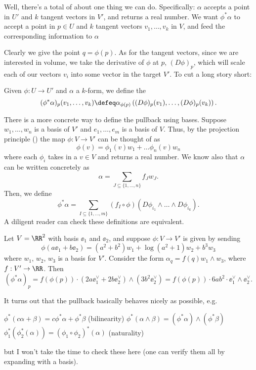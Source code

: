 \documentclass[11pt]{scrreprt}
\begin{document}
Well, there's a total of about one thing we can do.
Specifically: $\alpha$ accepts a point in $U'$ and $k$ tangent vectors in $V'$,
and returns a real number.
We want $\phi^\ast \alpha$ to accept a point in $p \in U$
and $k$ tangent vectors $v_1, \dots, v_k$ in $V$,
and feed the corresponding information to $\alpha$

Clearly we give the point $q = \phi(p)$.
As for the tangent vectors, since we are interested in volume, we take the
derivative of $\phi$ at $p$, $(D\phi)_p$, which will scale each of our vectors $v_i$
into some vector in the target $V'$.
To cut a long story short:
\begin{definition}
	Given $\phi : U \to U'$ and $\alpha$ a $k$-form, we define the 
	\[
		(\phi^\ast \alpha)_p(v_1, \dots, v_k)
		\defeq \alpha_{\phi(p)}
		\left( (D\phi)_p(v_1), \dots, (D\phi)_p(v_k) \right).
	\]
\end{definition}

There is a more concrete way to define the pullback using bases.
Suppose $w_1, \dots, w_n$ is a basis of $V'$
and $e_1, \dots, e_m$ is a basis of $V$.
Thus, by the projection principle () 
the map $\phi : V \to V'$ can be thought of as
\[ \phi(v) = \phi_1(v) w_1 +  \dots \phi_n(v) w_n \]
where each $\phi_i$ takes in a $v \in V$ and returns a real number.
We know also that $\alpha$ can be written concretely as
\[ \alpha = \sum_{J \subseteq \{1, \dots, n\}} f_J w_J. \]
Then, we define
\[
	\phi^\ast\alpha
	= \sum_{I \subseteq \{1, \dots, m\}}
	(f_I \circ \phi) (D\phi_{i_1} \wedge \dots \wedge D\phi_{i_k}).
\]
A diligent reader can check these definitions are equivalent.
\begin{example}
	Let $V = \RR^2$ with basis $\ee_1$ and $\ee_2$,
	and suppose $\phi : V \to V'$ is given by sending
	\[ \phi(a\ee_1 + b\ee_2) = (a^2+b^2)w_1 + \log(a^2+1) w_2 + b^3 w_3 \]
	where $w_1$, $w_2$, $w_3$ is a basis for $V'$.
	Consider the form $\alpha_q = f(q) w_1 \wedge w_3$, where $f : V' \to \RR$.
	Then
	\[ (\phi^\ast\alpha)_p = f(\phi(p)) \cdot (2a \ee_1^\vee + 2b\ee_2^\vee) \wedge (3b^2 \ee_2^\vee)
		= f(\phi(p)) \cdot 6ab^2 \cdot \ee_1^\vee \wedge \ee_2^\vee. \]
\end{example}

It turns out that the pullback basically behaves nicely as possible, e.g.\
\begin{itemize}
	\ii $\phi^\ast(c\alpha + \beta) = c\phi^\ast \alpha + \phi^\ast\beta$ (bilinearity)
	\ii $\phi^\ast(\alpha\wedge\beta)
	= (\phi^\ast \alpha)\wedge(\phi^\ast \beta)$
	\ii $\phi_1^\ast(\phi_2^\ast(\alpha)) 
	= (\phi_1 \circ \phi_2)^\ast(\alpha)$ (naturality)
\end{itemize}
but I won't take the time to check these here
(one can verify them all by expanding with a basis).
	
\end{document}
